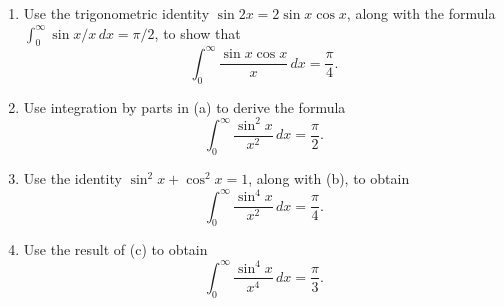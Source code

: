 \begin{problembox}
\begin{enumerate}[label=(\alph*)]
    \item Use the trigonometric identity $\sin 2x = 2 \sin x \cos x$, along with the formula $\int_{0}^{\infty} \sin x/x \, dx = \pi/2$, to show that
    \[\int_{0}^{\infty} \frac{\sin x \cos x}{x} \, dx = \frac{\pi}{4}.\]
    \item Use integration by parts in (a) to derive the formula
    \[\int_{0}^{\infty} \frac{\sin^2 x}{x^2} \, dx = \frac{\pi}{2}.\]
    \item Use the identity $\sin^2 x + \cos^2 x = 1$, along with (b), to obtain
    \[\int_{0}^{\infty} \frac{\sin^4 x}{x^2} \, dx = \frac{\pi}{4}.\]
    \item Use the result of (c) to obtain
    \[\int_{0}^{\infty} \frac{\sin^4 x}{x^4} \, dx = \frac{\pi}{3}.\]
\end{enumerate}
\end{problembox}

